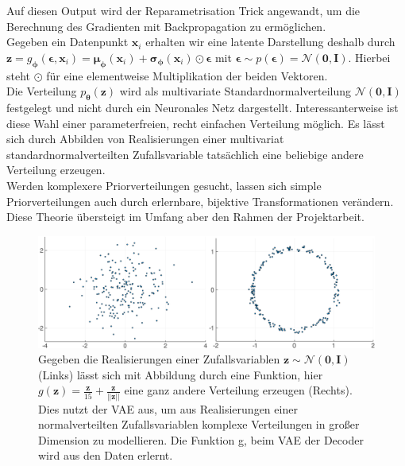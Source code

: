 \documentclass[12pt]{article}
\newcommand{\z}{\mathbf{z}}
\begin{document}
	Auf diesen Output wird der Reparametrisation Trick angewandt, um die Berechnung des Gradienten mit Backpropagation zu ermöglichen.\\
	Gegeben ein Datenpunkt $\textbf{x}_{i}$ erhalten wir eine latente Darstellung deshalb durch $\textbf{z} = g_{\boldsymbol\phi}(\boldsymbol\epsilon,\textbf{x}_{i})  =\boldsymbol\mu_{\boldsymbol\phi}(\textbf{x}_{i}) +\boldsymbol\sigma_{\boldsymbol\phi}(\textbf{x}_{i}) \odot \boldsymbol\epsilon$ mit $\boldsymbol\epsilon \sim p(\boldsymbol\epsilon) = \mathcal{N}(\textbf{0},\textbf{I})$. Hierbei steht $\odot$ für eine elementweise Multiplikation der beiden Vektoren.\\
	Die Verteilung $p_{\boldsymbol\theta}(\z)$ wird als multivariate Standardnormalverteilung $\mathcal{N}(\mathbf{0},\mathbf{I})$ festgelegt und nicht durch ein Neuronales Netz dargestellt. Interessanterweise ist diese Wahl einer parameterfreien, recht einfachen Verteilung möglich. Es lässt sich durch Abbilden von Realisierungen einer multivariat standardnormalverteilten Zufallsvariable tatsächlich eine beliebige andere Verteilung erzeugen.\\ Werden komplexere Priorverteilungen gesucht, lassen sich simple Priorverteilungen auch durch erlernbare, bijektive Transformationen verändern. Diese Theorie übersteigt im Umfang aber den Rahmen der Projektarbeit.
	\vspace*{0.1cm}
	\begin{figure}[h!]
		\centering
		\includegraphics[scale=0.4]{normalverteilt}
		\captionsetup{labelformat=empty}
		\caption{Gegeben die Realisierungen einer Zufallsvariablen $\z\sim \mathcal{N}(\mathbf{0},\mathbf{I})$  (Links) lässt sich mit Abbildung durch eine Funktion, hier $g(\textbf{z})= \frac{\textbf{z}}{15}+\frac{\textbf{z}}{||\textbf{z}||}$ eine ganz andere Verteilung erzeugen (Rechts). Dies nutzt der VAE aus, um aus Realisierungen einer normalverteilten Zufallsvariablen komplexe Verteilungen in großer Dimension zu modellieren. Die Funktion g, beim VAE der Decoder wird aus den Daten erlernt. \textbf{}\cite{tutvae}}
	\end{figure}
\end{document}
